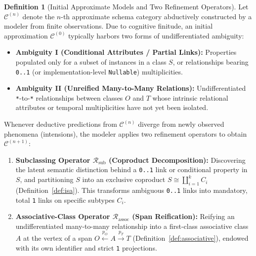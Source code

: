 \documentclass[11pt,a4paper]{article}
\theoremstyle{definition}
\newtheorem{definition}{Definition}[section]
\theoremstyle{plain}
\theoremstyle{remark}
\newcommand{\Rsub}{\mathcal{R}_{\mathrm{sub}}}
\newcommand{\Rassoc}{\mathcal{R}_{\mathrm{assoc}}}
\begin{document}
\begin{definition}[Initial Approximate Models and Two Refinement Operators]\label{def:refinement}
Let $\mathcal{C}^{(n)}$ denote the $n$-th approximate schema category abductively constructed by a modeler from finite observations. Due to cognitive finitude, an initial approximation $\mathcal{C}^{(0)}$ typically harbors two forms of undifferentiated ambiguity:
\begin{itemize}
    \item \textbf{Ambiguity I (Conditional Attributes / Partial Links):} Properties populated only for a subset of instances in a class $S$, or relationships bearing \texttt{0..1} (or implementation-level \texttt{Nullable}) multiplicities.
    \item \textbf{Ambiguity II (Unreified Many-to-Many Relations):} Undifferentiated \texttt{*}-to-\texttt{*} relationships between classes $O$ and $T$ whose intrinsic relational attributes or temporal multiplicities have not yet been isolated.
\end{itemize}
Whenever deductive predictions from $\mathcal{C}^{(n)}$ diverge from newly observed phenomena (intensions), the modeler applies two refinement operators to obtain $\mathcal{C}^{(n+1)}$:
\begin{enumerate}
    \item \textbf{Subclassing Operator $\Rsub$ (Coproduct Decomposition):} Discovering the latent semantic distinction behind a \texttt{0..1} link or conditional property in $S$, and partitioning $S$ into an exclusive coproduct $S \cong \coprod_{i=1}^k C_i$ (Definition~\ref{def:isa}). This transforms ambiguous \texttt{0..1} links into mandatory, total \texttt{1} links on specific subtypes $C_i$.
    \item \textbf{Associative-Class Operator $\Rassoc$ (Span Reification):} Reifying an undifferentiated many-to-many relationship into a first-class associative class $A$ at the vertex of a span $O \xleftarrow{p_O} A \xrightarrow{p_T} T$ (Definition~\ref{def:associative}), endowed with its own identifier and strict \texttt{1} projections.
\end{enumerate}
\end{definition}
\end{document}
